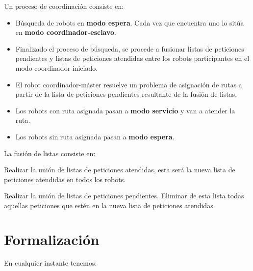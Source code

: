 \documentclass[preprint,12pt]{elsarticle}
\begin{document}
\begin{itemize}
\item{Un proceso de coordinación consiste en:
\begin{itemize}
\item{Búsqueda de robots en \textbf{modo espera}. Cada vez que encuentra uno lo sitúa en \textbf{modo coordinador-esclavo}. }
\item{Finalizado el proceso de búsqueda, se procede a fusionar listas de peticiones pendientes y listas de peticiones atendidas entre los robots participantes en el modo coordinador iniciado.}
\item{El robot coordinador-máster resuelve un problema de asignación de rutas a partir de la lista de peticiones pendientes resultante de la fusión de listas.}
\item{Los robots con ruta asignada pasan a \textbf{modo servicio} y van a atender la ruta.}
\item{Los robots sin ruta asignada pasan a \textbf{modo espera}.}
\end{itemize}
}

\item{La fusión de listas consiste en:

\item Realizar la unión de listas de peticiones atendidas, esta será la nueva lista de peticiones atendidas en todos los robots.
\item Realizar la unión de listas de peticiones pendientes. Eliminar de esta lista todas aquellas peticiones que estén en la nueva lista de peticiones atendidas.

} 

\end{itemize}

\section{Formalización}

En cualquier instante tenemos:
\end{document}
